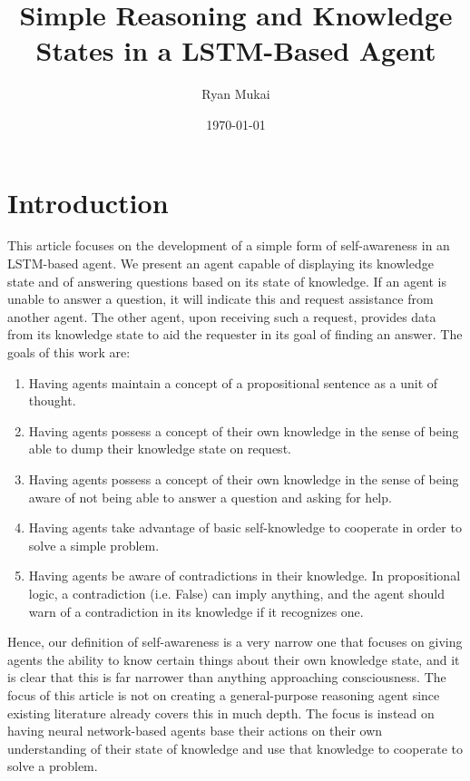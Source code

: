 \documentclass{article}
\title{Simple Reasoning and Knowledge States in a LSTM-Based Agent}
\author{Ryan Mukai}
\date{\today}
\begin{document}
\maketitle

\section{Introduction}

This article focuses on the development of a simple form of self-awareness in an LSTM-based agent. We present an agent capable of displaying its knowledge state and of answering questions based on its state of knowledge. If an agent is unable to answer a question, it will indicate this and request assistance from another agent. The other agent, upon receiving such a request, provides data from its knowledge state to aid the requester in its goal of finding an answer. The goals of this work are:

\begin{enumerate}
	\item Having agents maintain a concept of a propositional sentence as a unit of thought.
	\item Having agents possess a concept of their own knowledge in the sense of being able to dump their knowledge state on request.
	\item Having agents possess a concept of their own knowledge in the sense of being aware of not being able to answer a question and asking for help.
	\item Having agents take advantage of basic self-knowledge to cooperate in order to solve a simple problem.
	\item Having agents be aware of contradictions in their knowledge. In propositional logic, a contradiction (i.e. False) can imply anything, and the agent should warn of a contradiction in its knowledge if it recognizes one.
\end{enumerate}

Hence, our definition of self-awareness is a very narrow one that focuses on giving agents the ability to know certain things about their own knowledge state, and it is clear that this is far narrower than anything approaching consciousness. The focus of this article is not on creating a general-purpose reasoning agent since existing literature already covers this in much depth. The focus is instead on having neural network-based agents base their actions on their own understanding of their state of knowledge and use that knowledge to cooperate to solve a problem.
\end{document}
